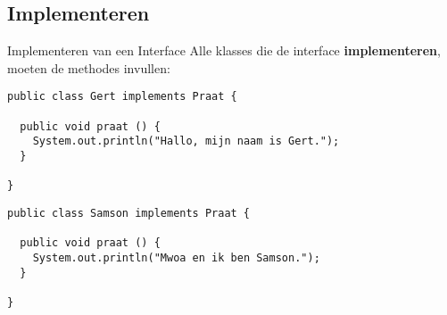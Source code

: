 \documentclass[handout]{beamer}
\theoremstyle{remark}
\newcommand{\term}[1]{\textbf{#1}}
\begin{document}
\subsection{Implementeren}
\begin{frame}[fragile]{Implementeren van een Interface}
Alle klasses die de interface \term{implementeren}, moeten de methodes invullen:
\begin{example}
\begin{lstlisting}
public class Gert implements Praat {

  public void praat () {
    System.out.println("Hallo, mijn naam is Gert.");
  }

}
\end{lstlisting}
\end{example}
\begin{example}
\small{\begin{lstlisting}
public class Samson implements Praat {

  public void praat () {
    System.out.println("Mwoa en ik ben Samson.");
  }

}
\end{lstlisting}}
\end{example}
\end{frame}
\end{document}
